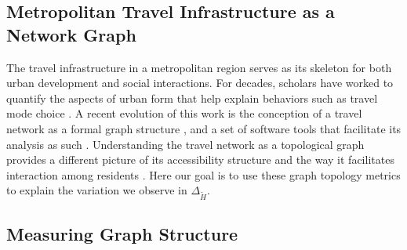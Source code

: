 \documentclass[
  10pt,
]{article}
\begin{document}
\hypertarget{metropolitan-travel-infrastructure-as-a-network-graph}{%
\subsection{Metropolitan Travel Infrastructure as a Network
Graph}\label{metropolitan-travel-infrastructure-as-a-network-graph}}

The travel infrastructure in a metropolitan region serves as its
skeleton for both urban development and social interactions. For
decades, scholars have worked to quantify the aspects of urban form that
help explain behaviors such as travel mode choice
\citep[\citet{ewing2010TravelBuilt}]{crane2000InfluenceUrban, clifton2008QuantitativeAnalysis, ewing2009MeasuringUnmeasurable}.
A recent evolution of this work is the conception of a travel network as
a formal graph structure
\citep{boeing2018PlanarityStreet, boeing2018MorphologyCircuity, fleischmann2021MethodologicalFoundation, fleischmann2018MeasuringUrban, araldi2019StreetMetropolitan, dibble2019OriginSpaces},
and a set of software tools that facilitate its analysis as such
\citep{boeing2016OSMnxNew, fleischmann2019MomepyUrban}. Understanding
the travel network as a topological graph provides a different picture
of its accessibility structure and the way it facilitates interaction
among residents \citep{levinson2017ElementsAccess}. Here our goal is to
use these graph topology metrics to explain the variation we observe in
\(\Delta_{\tilde{H}}\).

\hypertarget{measuring-graph-structure}{%
\subsection{Measuring Graph Structure}\label{measuring-graph-structure}}
\end{document}
